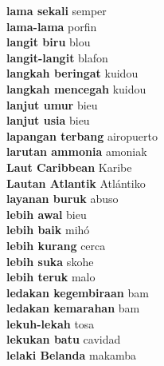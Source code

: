\textbf{ lama sekali  } semper \\
\textbf{ lama-lama  } porfin \\
\textbf{ langit biru  } blou \\
\textbf{ langit-langit  } blafon \\
\textbf{ langkah beringat  } kuidou \\
\textbf{ langkah mencegah  } kuidou \\
\textbf{ lanjut umur  } bieu \\
\textbf{ lanjut usia  } bieu \\
\textbf{ lapangan terbang  } airopuerto \\
\textbf{ larutan ammonia  } amoniak \\
\textbf{ Laut Caribbean  } Karibe \\
\textbf{ Lautan Atlantik  } Atlántiko \\
\textbf{ layanan buruk  } abuso \\
\textbf{ lebih awal  } bieu \\
\textbf{ lebih baik  } mihó \\
\textbf{ lebih kurang  } cerca \\
\textbf{ lebih suka  } skohe \\
\textbf{ lebih teruk  } malo \\
\textbf{ ledakan kegembiraan  } bam \\
\textbf{ ledakan kemarahan  } bam \\
\textbf{ lekuh-lekah  } tosa \\
\textbf{ lekukan batu  } cavidad \\
\textbf{ lelaki Belanda  } makamba \\
